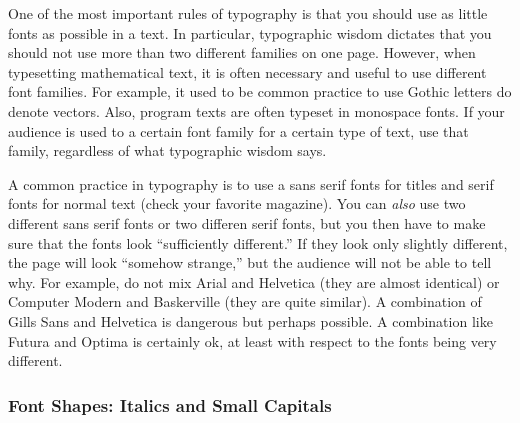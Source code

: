 One of the most important rules of typography is that you should use
as little fonts as possible in a text. In particular, typographic
wisdom dictates that you should not use more than two different
families on one page. However, when typesetting
mathematical text, it is often necessary and useful to use different
font families. For example, it used to be common practice to use
Gothic letters do denote vectors. Also, program texts are often
typeset in monospace fonts. If your audience is used to a certain font
family for a certain type of text, use that family, regardless of what
typographic wisdom says.

A common practice in typography is to use a sans serif fonts for
titles and serif fonts for normal text (check your favorite
magazine). You can \emph{also} use two different sans serif fonts or
two differen serif fonts, but you then have to make sure that the
fonts look ``sufficiently different.'' If they look only slightly
different, the page will look ``somehow strange,'' but the audience
will not be able to tell why. For example, do not mix Arial and
Helvetica (they are almost identical) or Computer Modern and
Baskerville (they are quite similar). A combination of Gills Sans and
Helvetica is dangerous but perhaps possible. A combination like Futura
and Optima is certainly ok, at least with respect to the fonts being
very different.




\subsubsection{Font Shapes: Italics and Small Capitals}

\label{section-italics}
\label{section-smallcaps}


